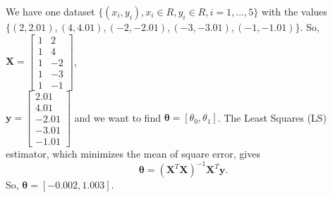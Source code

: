 \documentclass[12pt]{book}
\theoremstyle{definition}
\begin{document}
\noindent
We have one dataset $\{(x_i,y_i), x_i\in R, y_i \in R, i=1,\dots,5\}$ with the values \\ $\{(2,2.01),(4, 4.01), (-2, -2.01), (-3, -3.01), (-1, -1.01)\}$. So, $\bm{X} = \begin{bmatrix}
1 & 2 \\
1 & 4\\
1 & -2 \\
1 & -3 \\
1 & -1
\end{bmatrix}$, \\
$\bm{y} = \begin{bmatrix}
2.01 \\
4.01\\
-2.01  \\
-3.01 \\
-1.01
\end{bmatrix}$ and we want to find $\bm{\theta}=[\theta_0,\theta_1]$. The Least Squares (LS) estimator, which minimizes the mean of square error, gives
\begin{equation*}
\bm{\theta}= (\bm{X}^T\bm{X})^{-1}\bm{X}^T\bm{y}.
\end{equation*}
So, $\bm\theta = [-0.002,1.003]$.
\end{document}
